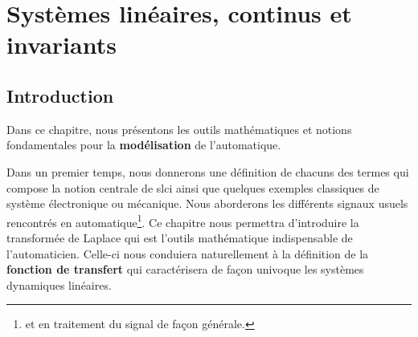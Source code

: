 \chapter[Systèmes linéaires, continus\ldots]
        {Systèmes linéaires, continus et invariants \label{chap-slci}}
\adjustmtc
\minitoc
\newpage
\section{Introduction}
Dans ce chapitre, nous présentons les outils mathématiques 
et notions fondamentales pour la \textbf{modélisation} de l'automatique.

Dans un premier temps, nous donnerons une définition de chacuns 
des termes qui compose la notion centrale de \gls{slci} ainsi que quelques
exemples classiques de système électronique ou mécanique.
Nous aborderons les différents signaux usuels rencontrés
en automatique\footnote{et en traitement du signal de façon générale.}.
Ce chapitre nous permettra d'introduire la transformée de Laplace qui 
est l'outils mathématique indispensable de l'automaticien.
Celle-ci nous conduiera naturellement à la définition 
de la \textbf{fonction de transfert} qui caractérisera de façon univoque 
les systèmes dynamiques linéaires.


